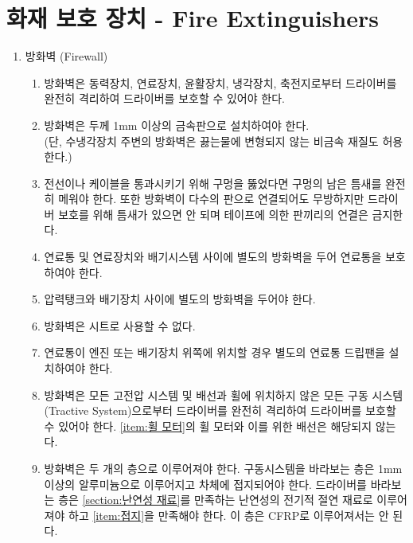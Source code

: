 \documentclass[final,a4paper,10pt]{report}
\begin{document}
\section{화재 보호 장치 - Fire Extinguishers}\label{rule:formula-technical.fire-extinguishers} \label{section:화재 보호 장치}
\begin{enumerate}
  \item\label{rule:formula-technical.fire-extinguishers.firewall} 방화벽 (Firewall) \label{item:방화벽}
    \begin{enumerate}
      \item\label{rule:formula-technical.fire-extinguishers.firewall.isolation-from-drivetrain-systems} 방화벽은 동력장치, 연료장치, 윤활장치, 냉각장치, 축전지로부터 드라이버를 완전히 격리하여 드라이버를 보호할 수 있어야 한다.
      \item\label{rule:formula-technical.fire-extinguishers.firewall.material-thickness-1mm} 방화벽은 두께 1mm 이상의 금속판으로 설치하여야 한다.\\
      (단, 수냉각장치 주변의 방화벽은 끓는물에 변형되지 않는 비금속 재질도 허용한다.)
      \item\label{rule:formula-technical.fire-extinguishers.firewall.penetration-sealing-and-joints} 전선이나 케이블을 통과시키기 위해 구멍을 뚫었다면 구멍의 남은 틈새를 완전히 메워야 한다. 또한 방화벽이 다수의 판으로 연결되어도 무방하지만 드라이버 보호를 위해 틈새가 있으면 안 되며 테이프에 의한 판끼리의 연결은 금지한다.
      \item\label{rule:formula-technical.fire-extinguishers.firewall.fuel-tank-exhaust-separation} 연료통 및 연료장치와 배기시스템 사이에 별도의 방화벽을 두어 연료통을 보호하여야 한다.
      \item\label{rule:formula-technical.fire-extinguishers.firewall.pressure-tank-exhaust-separation} 압력탱크와 배기장치 사이에 별도의 방화벽을 두어야 한다.
      \item\label{rule:formula-technical.fire-extinguishers.firewall.not-usable-as-seat} 방화벽은 시트로 사용할 수 없다.
      \item\label{rule:formula-technical.fire-extinguishers.firewall.fuel-tank-drip-pan} 연료통이 엔진 또는 배기장치 위쪽에 위치할 경우 별도의 연료통 드립팬을 설치하여야 한다.
      \item\label{rule:formula-technical.fire-extinguishers.firewall.isolation-from-tractive-system}  방화벽은 모든 고전압 시스템 및 배선과 휠에 위치하지 않은 모든 구동 시스템(Tractive System)으로부터 드라이버를 완전히 격리하여 드라이버를 보호할 수 있어야 한다. {\color{blue} \ref{item:휠 모터}의 휠 모터와 이를 위한 배선은 해당되지 않는다.}
      \item\label{rule:formula-technical.fire-extinguishers.firewall.two-layer-construction}  방화벽은 두 개의 층으로 이루어져야 한다. 구동시스템을 바라보는 층은 1mm 이상의 알루미늄으로 이루어지고 차체에 접지되어야 한다. 드라이버를 바라보는 층은 \ref{section:난연성 재료}를 만족하는 난연성의 전기적 절연 재료로 이루어져야 하고 \ref{item:접지}을 만족해야 한다. 이 층은 CFRP로 이루어져서는 안 된다. \label{item:e-formula 방화벽}
    \end{enumerate}


\end{enumerate}
\end{document}
